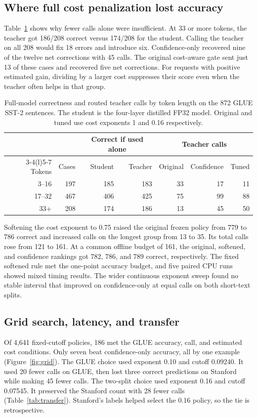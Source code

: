 \subsection{Where full cost penalization lost accuracy}
Table~\ref{tab:length} shows why fewer calls alone were insufficient. At 33 or more tokens, the teacher got 186/208 correct versus 174/208 for the student. Calling the teacher on all 208 would fix 18 errors and introduce six. Confidence-only recovered nine of the twelve net corrections with 45 calls. The original cost-aware gate sent just 13 of these cases and recovered five net corrections. For requests with positive estimated gain, dividing by a larger cost suppresses their score even when the teacher often helps in that group.

\begin{table}[H]
\centering
\caption{Full-model correctness and routed teacher calls by token length on the 872 GLUE SST-2 sentences. The student is the four-layer distilled FP32 model. Original and tuned use cost exponents 1 and 0.16 respectively.}
\label{tab:length}
\setlength{\tabcolsep}{5pt}
\begin{tabular}{rrrrrrr}
\toprule
 & & \multicolumn{2}{c}{Correct if used alone} & \multicolumn{3}{c}{Teacher calls}\\
\cmidrule(lr){3-4}\cmidrule(l){5-7}
Tokens & Cases & Student & Teacher & Original & Confidence & Tuned\\
\midrule
3--16 & 197 & 185 & 183 & 33 & 17 & 11\\
17--32 & 467 & 406 & 425 & 75 & 99 & 88\\
33+ & 208 & 174 & 186 & 13 & 45 & 50\\
\bottomrule
\end{tabular}
\end{table}

Softening the cost exponent to 0.75 raised the original frozen policy from 779 to 786 correct and increased calls on the longest group from 13 to 35. Its total calls rose from 121 to 161. At a common offline budget of 161, the original, softened, and confidence rankings got 782, 786, and 789 correct, respectively. The fixed softened rule met the one-point accuracy budget, and five paired CPU runs showed mixed timing results. The wider continuous exponent sweep found no stable interval that improved on confidence-only at equal calls on both short-text splits.

\subsection{Grid search, latency, and transfer}
Of 4,641 fixed-cutoff policies, 186 met the GLUE accuracy, call, and estimated cost conditions. Only seven beat confidence-only accuracy, all by one example (Figure~\ref{fig:grid}). The GLUE choice used exponent 0.10 and cutoff 0.09240. It used 20 fewer calls on GLUE, then lost three correct predictions on Stanford while making 45 fewer calls. The two-split choice used exponent 0.16 and cutoff 0.07545. It preserved the Stanford count with 28 fewer calls (Table~\ref{tab:transfer}). Stanford's labels helped select the 0.16 policy, so the tie is retrospective.

